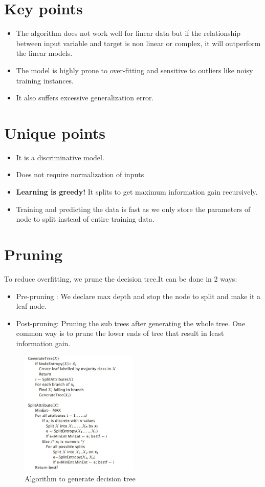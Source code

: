 \documentclass[12pt,letterpaper, onecolumn]{exam}
\begin{document}
\section*{Key points}
\begin{itemize}
\item The algorithm does not work well for linear data but if the relationship between input variable and target is non linear or complex, it will outperform the linear models.
\item The model is highly prone to over-fitting and sensitive to outliers like noisy training instances.
\item It also suffers excessive generalization error.
\end{itemize}
\section*{Unique points}
\begin{itemize}
\item It is a discriminative model.
\item Does not require normalization of inputs
\item \textbf{Learning is greedy!} It splits to get maximum information gain recursively.
\item Training and predicting the data is fast as we only store the parameters of node to split instead of entire training data.
\end{itemize}
\section*{Pruning}
To reduce overfitting, we prune the decision tree.It can be done in 2 ways:
\begin{itemize}
\item Pre-pruning : We declare max depth and stop the node to split and make it a leaf node.
\item Post-pruning: Pruning the sub trees after generating the whole tree. One common way is to prune the lower ends of tree that result in least information gain.
\end{itemize}

\begin{figure}[!h]
\caption{Algorithm to generate decision tree}
\centering
\includegraphics[width = 0.5\textwidth]{../images/tree_gen.jpg}
\end{figure}
\newpage
\end{document}

